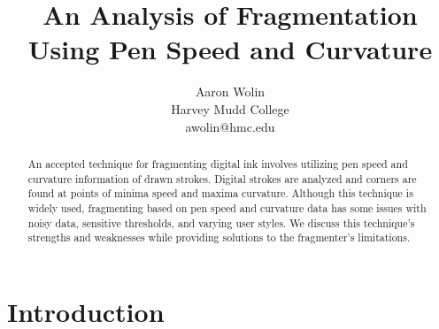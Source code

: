 \documentclass[10pt]{acmsiggraph}          %
\title{An Analysis of Fragmentation Using Pen Speed and Curvature}
\author{Aaron Wolin\\ Harvey Mudd College\\ awolin@hmc.edu}
\begin{document}


\maketitle



\begin{abstract}

An accepted technique for fragmenting digital ink involves utilizing pen speed and curvature information of drawn strokes.
Digital strokes are analyzed and corners are found at points of minima speed and maxima curvature. Although this technique is widely used, fragmenting 
based on pen speed and curvature data has some issues with noisy data, sensitive thresholds, and varying user styles. We discuss this technique's strengths 
and weaknesses while providing solutions to the fragmenter's limitations.



\end{abstract}



\keywordlist


\section{Introduction} %
\end{document}
